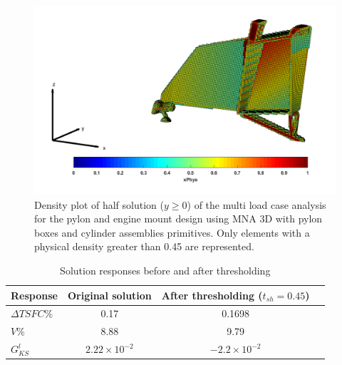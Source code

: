                             \begin{figure}[ht]
                             \centering
                             \includegraphics[width=\textwidth]{images/Ch3/pylon_Density_plot_143}
                             \caption{Density plot of half solution ($y\geq 0$) of the multi load case analysis for the pylon and engine mount design using MNA 3D with pylon boxes and cylinder assemblies primitives. Only elements with a physical density greater than 0.45 are represented.}
                             \label{fig.3.46}
                             \end{figure}
                              \begin{table}[h]
                                                                       \caption{\label{tab:table7} Solution responses before and after thresholding }
                                                                        \centering
                                                                        \begin{tabular}{lccc}
                                                                        \hline
                                                                         Response& Original solution& After thresholding ($t_{sh}=0.45$) \\\hline
                                                                       $\Delta TSFC \%$ & 0.17 & 0.1698 \\
                                                                       $V \%$ & 8.88 & 9.79 \\
                                                                       $G_{KS}^l$ & $2.22\times 10^{-2}$ & $-2.2\times 10^{-2}$ \\
                                                                        \hline
                                                                        \end{tabular}
                                                                        \end{table}
